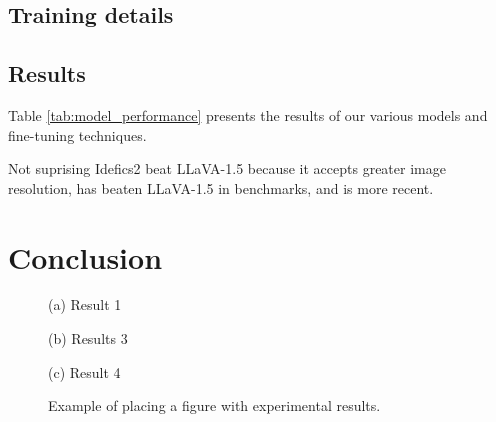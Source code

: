 \documentclass{article}
\begin{document}
\subsection{Training details}

\subsection{Results}

Table \ref{tab:model_performance} presents the results of our various models and fine-tuning techniques.


Not suprising Idefics2 beat LLaVA-1.5 because it accepts greater image resolution, has beaten LLaVA-1.5 in benchmarks, and is more recent. 


\section{Conclusion}
\label{sec:conclusion}



\begin{figure}[htb]

\begin{minipage}[b]{1.0\linewidth}
  \centering
  \centerline{(a) Result 1}\medskip
\end{minipage}
%
\begin{minipage}[b]{.48\linewidth}
  \centering
  \centerline{(b) Results 3}\medskip
\end{minipage}
\hfill
\begin{minipage}[b]{0.48\linewidth}
  \centering
  \centerline{(c) Result 4}\medskip
\end{minipage}
%
\caption{Example of placing a figure with experimental results.}
\label{fig:res}
%
\end{figure}




\vfill\pagebreak




\end{document}
